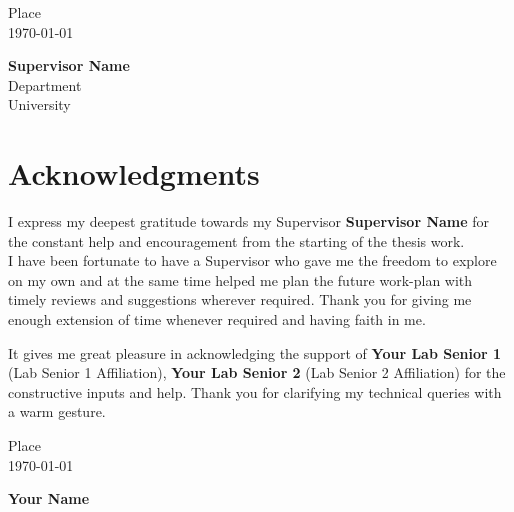 \documentclass[11pt,a4paper]{report}
\newcommand{\Name}{Your Name}
\newcommand{\Supervisor}{Supervisor Name} %
\newcommand{\Department}{Department}
\newcommand{\University}{University}
\newcommand{\Place}{Place}
\newcommand{\ThanksOne}{Your Lab Senior 1}
\newcommand{\ThanksOneAffil}{Lab Senior 1 Affiliation} %
\newcommand{\ThanksTwo}{Your Lab Senior 2}
\newcommand{\ThanksTwoAffil}{Lab Senior 2 Affiliation}
\begin{document}
\begin{flushleft}
\Place\\
\today
\end{flushleft}


\begin{flushright}
\textbf{\Supervisor}\\
\Department\\
\University
\end{flushright}
\thispagestyle{empty}
\pagebreak



\chapter*{\centering Acknowledgments}

I express my deepest gratitude towards my Supervisor \textbf{\Supervisor} for the constant help and encouragement from the starting of the thesis work.\\
I have been fortunate to have a Supervisor who gave me the freedom to explore on my own and at the same time helped me plan the future work-plan with timely reviews and suggestions wherever required. Thank you for giving me enough extension of time whenever required and having faith in me.

It gives me great pleasure in acknowledging the support of \textbf{\ThanksOne} (\ThanksOneAffil), \textbf{\ThanksTwo} (\ThanksTwoAffil) for the constructive inputs and help. Thank you for clarifying my technical queries with a warm gesture.
\vspace{18pt}

\begin{flushleft}
\Place\\
\today
\end{flushleft}

\begin{flushright}
\textbf{\Name}\\
\end{flushright}


\thispagestyle{empty}
\pagebreak



\tableofcontents
\thispagestyle{empty}
\pagebreak

\listoftables
\thispagestyle{empty}
\pagebreak
\end{document}
